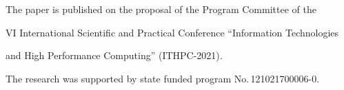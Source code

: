 























\Ack


\noindent


The paper is published on the proposal of the Program Committee of the 


VI International Scientific and Practical Conference ``Information Technologies 


and High Performance Computing'' (ITHPC-2021).


 The research was supported by state funded program No.\,121021700006-0.


 













\renewcommand{\bibname}{\protect\rmfamily References}







